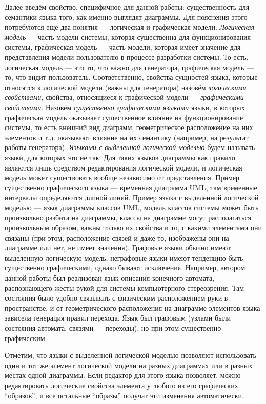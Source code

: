 Далее введём свойство, специфичное для данной работы: существенность для семантики 
языка того, как именно выглядят диаграммы. Для пояснения этого потребуются ещё два 
понятия --- логическая и графическая модели. 
\textit{Логическая модель} --- часть модели системы, которая существенна для 
функционирования системы, графическая модель --- часть модели, которая имеет 
значение для представления модели пользователю в процессе разработки системы. 
То есть, логическая модель --- это то, что важно для генератора, графическая 
модель --- то, что видит пользователь. Соответственно, свойства сущностей языка, 
которые относятся к логической модели (важны для генератора) назовём \textit{логическими 
свойствами}, свойства, относящиеся к графической модели --- \textit{графическими 
свойствами}. Назовём \textit{существенно графическими языками} языки, в которых 
графическая модель оказывает существенное влияние на функционирование системы, 
то есть внешний вид диаграмм, геометрическое расположение на них элементов 
и т.д. оказывают влияние на их семантику (например, на результат работы генератора). \textit{Языками с выделенной 
логической моделью} будем называть языки, для которых это не так. Для таких 
языков диаграммы как правило являются лишь средством редактирования логической 
модели, и логическая модель может существовать вообще независимо от 
представления. Пример существенно графического языка --- временная диаграмма 
\ac{UML}, там временные интервалы определяются длиной линий. Пример языка с 
выделенной логической моделью --- язык диаграммы классов \ac{UML}, модель классов 
системы может быть произвольно разбита на диаграммы, классы на диаграмме могут 
располагаться произвольным образом, важны только их свойства и то, с какими 
элементами они связаны (при этом, расположение связей и даже то, изображены 
они на диаграмме или нет, не имеет значения). Графовые языки обычно имеют 
выделенную логическую модель, неграфовые языки имеют тенденцию быть существенно 
графическими, однако бывают исключения. Например, автором данной работы был 
реализован язык описания конечного автомата, распознающего жесты рукой для 
системы компьютерного стереозрения. Там состояния было удобно связывать с 
физическим расположением руки в пространстве, и от геометрического расположения 
на диаграмме элементов языка зависела генерация правил перехода. Язык был 
графовым (узлами были состояния автомата, связями --- переходы), но при этом 
существенно графическим.

Отметим, что языки с выделенной логической моделью позволяют 
использовать один и тот же элемент логической модели на разных диаграммах или 
в разных местах одной диаграммы. Если редактор для этого языка позволяет, можно 
редактировать логические свойства элемента у любого из его графических 
"`образов"', и все остальные "`образы"' получат эти изменения автоматически. 
